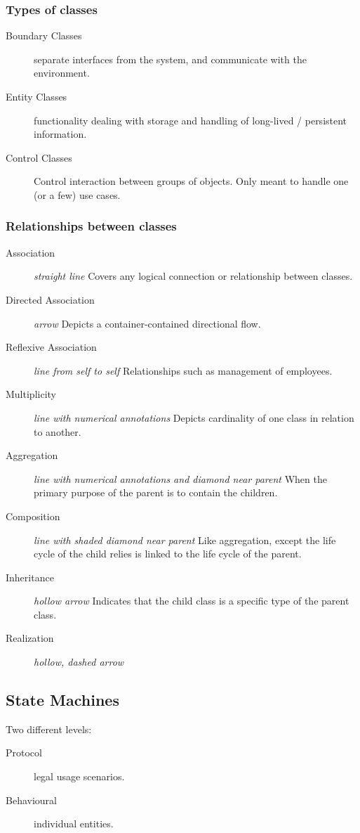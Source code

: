 \documentclass[landscape]{cheat}
\begin{document}
\begin{multicols}{3}
\subsubsection{Types of classes}
\begin{description}
    \item[Boundary Classes] separate interfaces from the system, and communicate with the environment.
    \item[Entity Classes] functionality dealing with storage and handling of long-lived / persistent information.
    \item[Control Classes] Control interaction between groups of objects. Only meant to handle one (or a few) use cases.
\end{description}

\subsubsection{Relationships between classes}
\begin{description}
    \item[Association] \textit{straight line} Covers any logical connection or relationship between classes.
    \item[Directed Association] \textit{arrow} Depicts a container-contained directional flow.
    \item[Reflexive Association] \textit{line from self to self} Relationships such as management of employees.
    \item[Multiplicity] \textit{line with numerical annotations} Depicts cardinality of one class in relation to another.
    \item[Aggregation] \textit{line with numerical annotations and diamond near parent} When the primary purpose of the parent is to contain the children.
    \item[Composition] \textit{line with shaded diamond near parent} Like aggregation, except the life cycle of the child relies is linked to the life cycle of the parent.
    \item[Inheritance] \textit{hollow arrow} Indicates that the child class is a specific type of the parent class.
    \item[Realization] \textit{hollow, dashed arrow}
\end{description}

\subsection{State Machines}
Two different levels:
\begin{description}
    \item[Protocol] legal usage scenarios.
    \item[Behavioural] individual entities.
\end{description}


\end{multicols}
\end{document}
